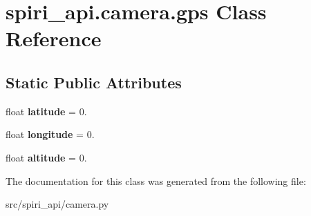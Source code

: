 \hypertarget{classspiri__api_1_1camera_1_1gps}{\section{spiri\-\_\-api.\-camera.\-gps \-Class \-Reference}
\label{classspiri__api_1_1camera_1_1gps}
}
\subsection*{\-Static \-Public \-Attributes}
\begin{DoxyCompactItemize}
\item 
\hypertarget{classspiri__api_1_1camera_1_1gps_a20e03de9b41089fb8756efe7d51c2f84}{float {\bfseries latitude} = 0.}\label{classspiri__api_1_1camera_1_1gps_a20e03de9b41089fb8756efe7d51c2f84}

\item 
\hypertarget{classspiri__api_1_1camera_1_1gps_a3a849c2571f935c95f60ad67e82c2924}{float {\bfseries longitude} = 0.}\label{classspiri__api_1_1camera_1_1gps_a3a849c2571f935c95f60ad67e82c2924}

\item 
\hypertarget{classspiri__api_1_1camera_1_1gps_a4510fcf49bfd80f696ddf98cfc6cf5d1}{float {\bfseries altitude} = 0.}\label{classspiri__api_1_1camera_1_1gps_a4510fcf49bfd80f696ddf98cfc6cf5d1}

\end{DoxyCompactItemize}


\-The documentation for this class was generated from the following file\-:\begin{DoxyCompactItemize}
\item 
src/spiri\-\_\-api/camera.\-py\end{DoxyCompactItemize}
